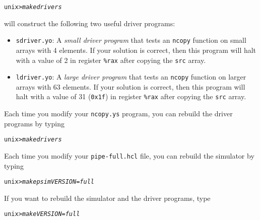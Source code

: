 \documentclass[11pt]{article}
\newenvironment{tty}%
{\small\begin{alltt}}%
{\end{alltt}}
\begin{document}
\begin{tty}
unix> {\em make drivers}
\end{tty}
will construct the following two useful driver programs:

\begin{itemize}
\item \texttt{sdriver.yo}: A {\em small driver program} that tests
an \texttt{ncopy} function on small arrays with 4 elements.  
If your solution is correct, then this program will halt with a value
of 2 in register \texttt{\%rax} after copying the \texttt{src}
array.

\item \texttt{ldriver.yo}: A {\em large driver program} that tests
an \texttt{ncopy} function on larger arrays with 63 elements.  If
your solution is correct, then this program will halt with a value of
31 (\texttt{0x1f}) in register \texttt{\%rax} after copying the
\texttt{src} array.
\end{itemize}
Each time you modify your \texttt{ncopy.ys} program, you can 
rebuild the driver programs by typing
\begin{tty}
unix> {\em make drivers}
\end{tty}
Each time you modify your \texttt{pipe-full.hcl} file, you 
can rebuild the simulator by typing 
\begin{tty}
unix> {\em make psim VERSION=full}
\end{tty}
If you want to rebuild the simulator and the driver programs, type
\begin{tty}
unix> {\em make VERSION=full}
\end{tty}
\end{document}
